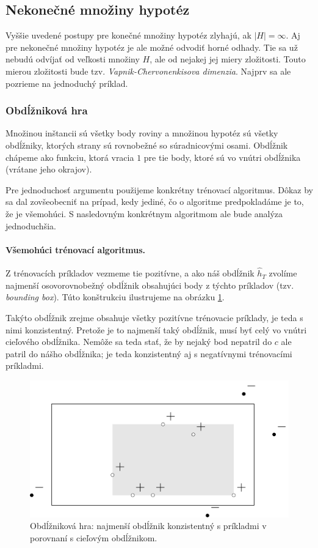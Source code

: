 \subsection{Nekonečné množiny hypotéz}

Vyššie uvedené postupy pre konečné množiny hypotéz zlyhajú, ak
$|H| = \infty$. Aj pre nekonečné množiny hypotéz je ale možné
odvodiť horné odhady. Tie sa už nebudú odvíjať od veľkosti množiny $H$,
ale od nejakej jej miery zložitosti. Touto mierou zložitosti bude tzv.
\emph{Vapnik-Chervonenkisova dimenzia}. Najprv sa ale pozrieme
na jednoduchý príklad.




\subsubsection{Obdĺžniková hra}

Množinou inštancii sú všetky body roviny a množinou hypotéz sú všetky
obdĺžniky, ktorých strany sú rovnobežné so súradnicovými osami. Obdĺžnik
chápeme ako funkciu, ktorá vracia $1$ pre tie body, ktoré sú vo vnútri
obdĺžnika (vrátane jeho okrajov).

Pre jednoduchosť argumentu použijeme konkrétny trénovací algoritmus.
Dôkaz by sa dal zovšeobecniť na prípad, kedy jediné, čo o algoritme
predpokladáme je to, že je všemohúci. S nasledovným konkrétnym algoritmom
ale bude analýza jednoduchšia.

\paragraph{Všemohúci trénovací algoritmus.} Z trénovacích príkladov 
vezmeme tie pozitívne, a ako náš obdĺžnik $\hat{h}_T$ zvolíme najmenší
osovorovnobežný obdĺžnik obsahujúci body z týchto príkladov (tzv.
\emph{bounding box}). Túto konštrukciu ilustrujeme na obrázku \ref{rectgame:hath}.

Takýto obdĺžnik zrejme obsahuje všetky pozitívne
trénovacie príklady, je teda s nimi konzistentný. Pretože je to najmenší
taký obdĺžnik, musí byť celý vo vnútri cieľového obdĺžnika. Nemôže sa teda
stať, že by nejaký bod nepatril do $c$ ale patril do nášho obdĺžnika; je
teda konzistentný aj s negatívnymi trénovacími príkladmi.

\begin{figure}
  \centering
  \includegraphics[scale=1]{obrazky/rectgame1.pdf}
  \caption{
    Obdĺžniková hra: najmenší obdĺžnik konzistentný s príkladmi
    v porovnaní s cieľovým obdĺžnikom.
  }
  \label{rectgame:hath}
\end{figure}

